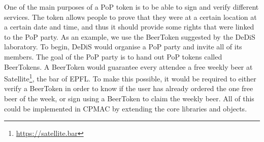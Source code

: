 \begin{description}[style=nextline]
\item[Sign and Verify Services] One of the main purposes of a PoP token is to be able to sign and verify different services. The token allows people to prove that they were at a certain location at a certain date and time, and thus it should provide some rights that were linked to the PoP party. As an example, we use the BeerToken suggested by the DeDiS laboratory. To begin, DeDiS would organise a PoP party and invite all of its members. The goal of the PoP party is to hand out PoP tokens called BeerTokens. A BeerToken would guarantee every attendee a free weekly beer at Satellite\footnote{\url{https://satellite.bar}}, the bar of EPFL. To make this possible, it would be required to either verify a BeerToken in order to know if the user has already ordered the one free beer of the week, or sign using a BeerToken to claim the weekly beer. All of this could be implemented in CPMAC by extending the core libraries and objects.
\end{description}
